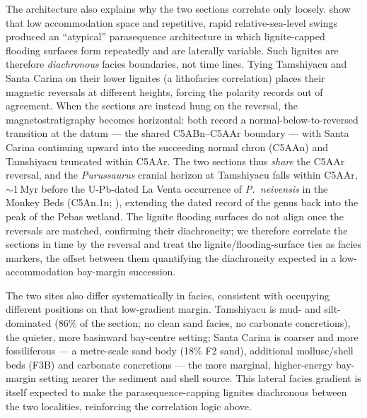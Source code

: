 \documentclass[11pt]{article}
\begin{document}
The architecture also explains why the two sections correlate only loosely.
\citet{Gingras2002} show that low accommodation space and repetitive, rapid
relative-sea-level swings produced an ``atypical'' parasequence architecture in
which lignite-capped flooding surfaces form repeatedly and are laterally variable.
Such lignites are therefore \emph{diachronous} facies boundaries, not time lines.
Tying Tamshiyacu and Santa Carina on their lower lignites (a lithofacies
correlation) places their magnetic reversals at different heights, forcing the
polarity records out of agreement. When the sections are instead hung on the
reversal, the magnetostratigraphy becomes horizontal: both record a
normal-below-to-reversed transition at the datum --- the shared C5ABn--C5AAr
boundary --- with Santa Carina continuing upward into the succeeding normal chron
(C5AAn) and Tamshiyacu truncated within C5AAr. The two sections thus \emph{share}
the C5AAr reversal, and the \textit{Purussaurus} cranial horizon at Tamshiyacu
falls within C5AAr, $\sim$1\,Myr before the U-Pb-dated La Venta occurrence of
\textit{P.\ neivensis} in the Monkey Beds (C5An.1n; \citealp{MoraRojas2023}), extending the
dated record of the genus back into the peak of the Pebas wetland. The lignite flooding surfaces do
not align once the reversals are matched, confirming their diachroneity; we
therefore correlate the sections in time by the reversal and treat the
lignite/flooding-surface ties as facies markers, the offset between them
quantifying the diachroneity expected in a low-accommodation bay-margin succession.

The two sites also differ systematically in facies, consistent with occupying
different positions on that low-gradient margin. Tamshiyacu is mud- and
silt-dominated (86\% of the section; no clean sand facies, no carbonate
concretions), the quieter, more basinward bay-centre setting; Santa Carina is
coarser and more fossiliferous --- a metre-scale sand body (18\% F2 sand),
additional mollusc/shell beds (F3B) and carbonate concretions --- the more
marginal, higher-energy bay-margin setting nearer the sediment and shell source.
This lateral facies gradient is itself expected to make the parasequence-capping
lignites diachronous between the two localities, reinforcing the correlation logic
above.
\end{document}
